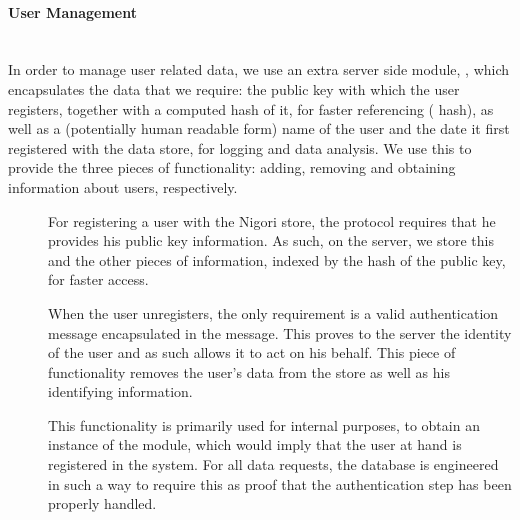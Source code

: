 \paragraph{User Management} ~\\
In order to manage user related data, we use an extra server side module, , which encapsulates the data that we require: the public key with which the user registers, together with a computed hash of it, for faster referencing ( hash), as well as a (potentially human readable form) name of the user and the date it first registered with the data store, for logging and data analysis.
We use this to provide the three pieces of functionality: adding, removing and obtaining information about users, respectively.

\begin{description}
\item[]
For registering a user with the Nigori store, the protocol requires that he provides his public key information.
As such, on the server, we store this and the other pieces of information, indexed by the  hash of the public key, for faster access.

\item[]
When the user unregisters, the only requirement is a valid authentication message encapsulated in the  message.
This proves to the server the identity of the user and as such allows it to act on his behalf.
This piece of functionality removes the user's data from the store as well as his identifying information.

\item[]
This functionality is primarily used for internal purposes, to obtain an instance of the  module, which would imply that the user at hand is registered in the system.
For all data requests, the database is engineered in such a way to require this as proof that the authentication step has been properly handled.
\end{description}

